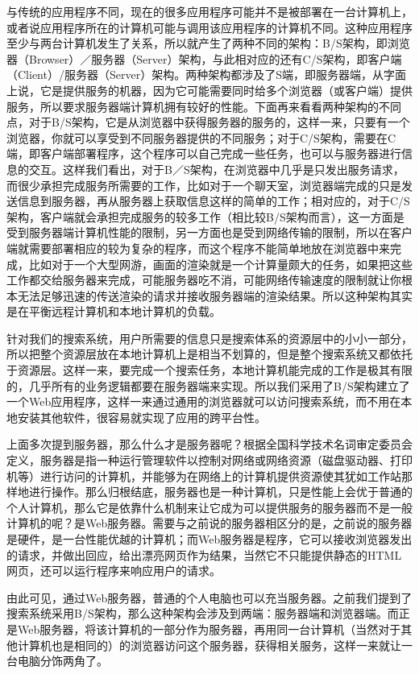 \documentclass[12pt,a4paper]{article}
\begin{document}
	与传统的应用程序不同，现在的很多应用程序可能并不是被部署在一台计算机上，或者说应用程序所在的计算机可能与调用该应用程序的计算机不同。这种应用程序至少与两台计算机发生了关系，所以就产生了两种不同的架构：B/S架构，即浏览器（Browser）／服务器（Server）架构，与此相对应的还有C/S架构，即客户端（Client）/服务器（Server）架构。两种架构都涉及了S端，即服务器端，从字面上说，它是提供服务的机器，因为它可能需要同时给多个浏览器（或客户端）提供服务，所以要求服务器端计算机拥有较好的性能。下面再来看看两种架构的不同点，对于B/S架构，它是从浏览器中获得服务器的服务的，这样一来，只要有一个浏览器，你就可以享受到不同服务器提供的不同服务；对于C/S架构，需要在C端，即客户端部署程序，这个程序可以自己完成一些任务，也可以与服务器进行信息的交互。这样我们看出，对于B／S架构，在浏览器中几乎是只发出服务请求，而很少承担完成服务所需要的工作，比如对于一个聊天室，浏览器端完成的只是发送信息到服务器，再从服务器上获取信息这样的简单的工作；相对应的，对于C/S架构，客户端就会承担完成服务的较多工作（相比较B/S架构而言），这一方面是受到服务器端计算机性能的限制，另一方面也是受到网络传输的限制，所以在客户端就需要部署相应的较为复杂的程序，而这个程序不能简单地放在浏览器中来完成，比如对于一个大型网游，画面的渲染就是一个计算量颇大的任务，如果把这些工作都交给服务器来完成，可能服务器吃不消，可能网络传输速度的限制就让你根本无法足够迅速的传送渲染的请求并接收服务器端的渲染结果。所以这种架构其实是在平衡远程计算机和本地计算机的负载。
	
	针对我们的搜索系统，用户所需要的信息只是搜索体系的资源层中的小小一部分，所以把整个资源层放在本地计算机上是相当不划算的，但是整个搜索系统又都依托于资源层。这样一来，要完成一个搜索任务，本地计算机能完成的工作是极其有限的，几乎所有的业务逻辑都要在服务器端来实现。所以我们采用了B/S架构建立了一个Web应用程序，这样一来通过通用的浏览器就可以访问搜索系统，而不用在本地安装其他软件，很容易就实现了应用的跨平台性。
	
	上面多次提到服务器，那么什么才是服务器呢？根据全国科学技术名词审定委员会定义，服务器是指一种运行管理软件以控制对网络或网络资源（磁盘驱动器、打印机等）进行访问的计算机，并能够为在网络上的计算机提供资源使其犹如工作站那样地进行操作。那么归根结底，服务器也是一种计算机，只是性能上会优于普通的个人计算机，那么它是依靠什么机制来让它成为可以提供服务的服务器而不是一般计算机的呢？是Web服务器。需要与之前说的服务器相区分的是，之前说的服务器是硬件，是一台性能优越的计算机；而Web服务器是程序，它可以接收浏览器发出的请求，并做出回应，给出漂亮网页作为结果，当然它不只能提供静态的HTML网页，还可以运行程序来响应用户的请求。
	
	由此可见，通过Web服务器，普通的个人电脑也可以充当服务器。之前我们提到了搜索系统采用B/S架构，那么这种架构会涉及到两端：服务器端和浏览器端。而正是Web服务器，将该计算机的一部分作为服务器，再用同一台计算机（当然对于其他计算机也是相同的）的浏览器访问这个服务器，获得相关服务，这样一来就让一台电脑分饰两角了。
	
\end{document}
